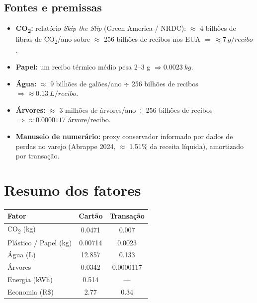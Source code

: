 \documentclass[11pt,a4paper]{article}
\begin{document}
\subsection{Fontes e premissas}
\begin{itemize}[leftmargin=1.4em]
\item \textbf{CO\textsubscript{2}:} relatório \emph{Skip the Slip}
(Green America / NRDC): $\approx$ 4 bilhões de libras de CO\textsubscript{2}/ano
sobre $\approx$ 256 bilhões de recibos nos EUA $\Rightarrow \approx \SI{7}{g/recibo}$.
\item \textbf{Papel:} um recibo térmico médio pesa 2--3 g $\Rightarrow \SI{0.0023}{kg}$.
\item \textbf{Água:} $\approx$ 9 bilhões de galões/ano $\div$ 256 bilhões de recibos
$\Rightarrow \approx \SI{0.13}{L/recibo}$.
\item \textbf{Árvores:} $\approx$ 3 milhões de árvores/ano $\div$ 256 bilhões de
recibos $\Rightarrow \approx \num{0.0000117}$ árvore/recibo.
\item \textbf{Manuseio de numerário:} proxy conservador informado por dados de
perdas no varejo (Abrappe 2024, $\approx$ 1,51\% da receita líquida), amortizado
por transação.
\end{itemize}

\section{Resumo dos fatores}

\begin{center}
\begin{tabularx}{\linewidth}{Y c c}
\toprule
{}
\textbf{\color{white}Fator} & \textbf{\color{white}Cartão} & \textbf{\color{white}Transação} \\
\midrule
CO\textsubscript{2} (kg)        & \num{0.0471}  & \num{0.007} \\
Plástico / Papel (kg)           & \num{0.00714} & \num{0.0023} \\
Água (L)                        & \num{12.857}  & \num{0.133} \\
Árvores                         & \num{0.0342}  & \num{0.0000117} \\
Energia (kWh)                   & \num{0.514}   & --- \\
Economia (R\$)                  & \num{2.77}    & \num{0.34} \\
\bottomrule
\end{tabularx}
\end{center}
\end{document}
